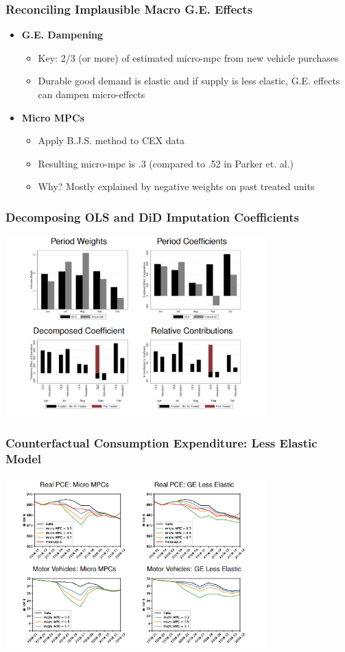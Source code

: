 \documentclass[english,xcolor=svgnames]{beamer}
\begin{document}
\begin{frame}
\frametitle{Reconciling Implausible Macro G.E. Effects}

\begin{itemize}
	\item \textbf{G.E. Dampening}
		\begin{itemize}
		\item Key: 2/3 (or more) of estimated micro-mpc from new vehicle purchases
		\item Durable good demand is elastic and if supply is less elastic, G.E. effects can dampen micro-effects
		\end{itemize}
		
\item \textbf{Micro MPCs}
	\begin{itemize}
		\item Apply B.J.S. method to CEX data
		\item Resulting micro-mpc is .3 (compared to .52 in Parker et. al.)
		\item Why? Mostly explained by negative weights on past treated units
	\end{itemize}
\end{itemize}

\end{frame}

\begin{frame}
\frametitle{Decomposing OLS and DiD Imputation Coefficients}
\begin{center}
\footnotesize
\centering
    \includegraphics[width=10cm]{figures/decompose_olsVbjs}
 \end{center} 
  \vspace{-0.5cm}
\end{frame}

\begin{frame}[label=baselinenominal]
\frametitle{Counterfactual Consumption Expenditure: Less Elastic Model}

\begin{center}
\footnotesize
\centering

    \includegraphics[width=10cm]{figures/macro_counterfactual2}
 \end{center} 
  \vspace{-0.5cm}
\end{frame}
\end{document}

